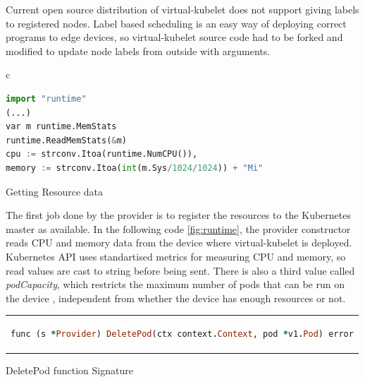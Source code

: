 Current open source distribution of virtual-kubelet does not support giving labels to registered nodes. Label based scheduling is an easy way of deploying correct programs to edge devices, so virtual-kubelet source code had to be forked and modified to update node labels from outside with arguments.
\begin{code}[htpb]
  \centering
  \begin{tabular}{c}
  \begin{lstlisting}[language=python]
import "runtime"
(...)
var m runtime.MemStats
runtime.ReadMemStats(&m)
cpu := strconv.Itoa(runtime.NumCPU()),
memory := strconv.Itoa(int(m.Sys/1024/1024)) + "Mi"

\end{lstlisting}
\end{tabular}
\caption{Getting Resource data}\label{fig:runtime}
\end{code}
The first job done by the provider is to register the resources to the Kubernetes master as available. In the following code \ref{fig:runtime}, the provider constructor reads CPU and memory data from the device where virtual-kubelet is deployed. Kubernetes API uses standartised metrics for measuring CPU and memory, so read values are cast to string before being sent. There is also a third value called \textit{podCapacity}, which restricts the maximum number of pods that can be run on the device , independent from whether the device has enough resources or not.


\begin{code}[htpb]
  \centering
  \begin{tabular}{c}
  \begin{lstlisting}[language=ruby]
    func (s *Provider) DeletePod(ctx context.Context, pod *v1.Pod) error
\end{lstlisting}
\end{tabular}
\caption{DeletePod function Signature}\label{fig:signature}
\end{code}

